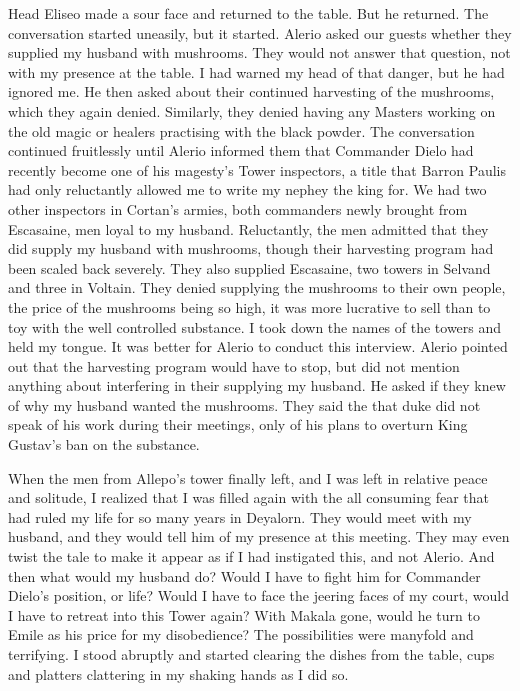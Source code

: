 \documentclass{article}
\begin{document}
Head Eliseo made a sour face and returned to the table. But he returned. The conversation started uneasily, but it started. Alerio asked our guests whether they supplied my husband with mushrooms. They would not answer that question, not with my presence at the table. I had warned my head of that danger, but he had ignored me. He then asked about their continued harvesting of the mushrooms, which they again denied. Similarly, they denied having any Masters working on the old magic or healers practising with the black powder. The conversation continued fruitlessly until Alerio informed them that Commander Dielo had recently become one of his magesty's Tower inspectors, a title that Barron Paulis had only reluctantly allowed me to write my nephey the king for. We had two other inspectors in Cortan's armies, both commanders newly brought from Escasaine, men loyal to my husband. Reluctantly, the men admitted that they did supply my husband with mushrooms, though their harvesting program had been scaled back severely. They also supplied Escasaine, two towers in Selvand and three in Voltain. They denied supplying the mushrooms to their own people, the price of the mushrooms being so high, it was more lucrative to sell than to toy with the well controlled substance. I took down the names of the towers and held my tongue. It was better for Alerio to conduct this interview. Alerio pointed out that the harvesting program would have to stop, but did not mention anything about interfering in their supplying my husband. He asked if they knew of why my husband wanted the mushrooms. They said the that duke did not speak of his work during their meetings, only of his plans to overturn King Gustav's ban on the substance. 

When the men from Allepo's tower finally left, and I was left in relative peace and solitude, I realized that I was filled again with the all consuming fear that had ruled my life for so many years in Deyalorn. They would meet with my husband, and they would tell him of my presence at this meeting. They may even twist the tale to make it appear as if I had instigated this, and not Alerio. And then what would my husband do? Would I have to fight him for Commander Dielo's position, or life? Would I have to face the jeering faces of my court, would I have to retreat into this Tower again? With Makala gone, would he turn to Emile as his price for my disobedience? The possibilities were manyfold and terrifying. I stood abruptly and started clearing the dishes from the table, cups and platters clattering in my shaking hands as I did so.
\end{document}
